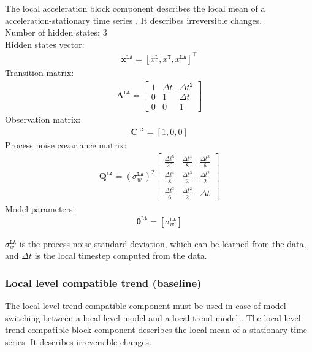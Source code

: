The local acceleration block component describes the local mean of a acceleration-stationary time series \cite{STC:STC2035}. 
It describes irreversible changes.\\

\noindent
Number of hidden states: 3\\

Hidden states vector: 
\begin{gather*}
\mathbf{x}^{\mathtt{LA}} = [x^{\mathtt{L}}, x^{\mathtt{T}} ,  x^{\mathtt{LA}}]^{\intercal}
\end{gather*}
Transition matrix: 
\begin{gather*}
\mathbf{A}^{\mathtt{LA}}=  \left[\begin{array}{ccc}1 &\Delta t&\Delta t^{2}\\0&1&\Delta t\\0&0&1\end{array}\right]
\end{gather*}
Observation matrix: 
\begin{gather*}
\mathbf{C}^{\mathtt{LA}}=[1, 0, 0]
\end{gather*}
Process noise covariance matrix: 
\begin{gather*}
\mathbf{Q}^{\mathtt{LA}}=(\sigma_{w}^{\mathtt{LA}})^{2}\left[\begin{array}{ccc}\tfrac{\Delta t^{5}}{20} &\tfrac{\Delta t^{4}}{8} &\tfrac{\Delta t^{3}}{6}\\\tfrac{\Delta t^{4}}{8} &\tfrac{\Delta t^{3}}{3}&\tfrac{\Delta t^{2}}{2}\\\tfrac{\Delta t^{3}}{6}&\tfrac{\Delta t^{2}}{2}&\Delta t\end{array}\right]
\end{gather*}
Model parameters: 
\begin{gather*}
\bm\theta^{\mathtt{LA}}=[\sigma_{w}^{\mathtt{LA}} ]
\end{gather*}

\noindent
$\sigma_{w}^{\mathtt{LA}}$ is the process noise standard deviation, which can be learned from the data, and $\Delta t$ is the local timestep computed from the data.



\subsubsection{Local level compatible trend (baseline)}

The local level trend compatible component must be used in case of model switching between a local level model and a local trend model \cite{Nguyen2018}.
The local level trend compatible block component describes the local mean of a stationary time series. 
It describes irreversible changes.\\

